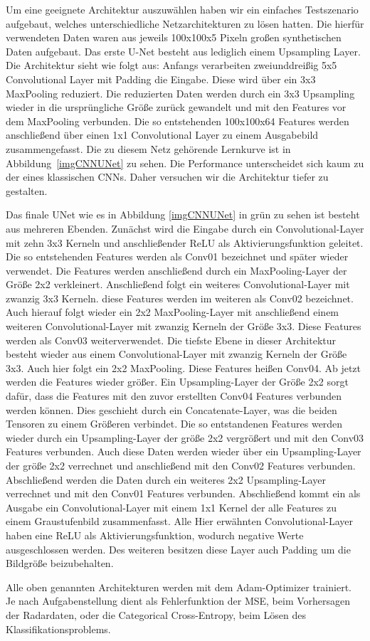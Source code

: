 Um eine geeignete Architektur auszuwählen haben wir ein einfaches Testszenario aufgebaut, welches unterschiedliche Netzarchitekturen zu lösen hatten. Die hierfür verwendeten Daten waren aus jeweils 100x100x5 Pixeln großen synthetischen Daten aufgebaut.
Das erste U-Net besteht aus lediglich einem Upsampling Layer. Die Architektur sieht wie folgt aus:
Anfangs verarbeiten zweiunddreißig 5x5 Convolutional Layer mit Padding die Eingabe. Diese wird über ein 3x3 MaxPooling reduziert. Die reduzierten Daten werden durch ein 3x3 Upsampling wieder in die ursprüngliche Größe zurück gewandelt und mit den Features vor dem MaxPooling verbunden. Die so entstehenden 100x100x64 Features werden anschließend über einen 1x1 Convolutional Layer zu einem Ausgabebild zusammengefasst.
Die zu diesem Netz gehörende Lernkurve ist in Abbildung~\ref{imgCNNUNet} zu sehen. Die Performance unterscheidet sich kaum zu der eines klassischen CNNs. Daher versuchen wir die Architektur tiefer zu gestalten.

Das finale UNet wie es in Abbildung \ref{imgCNNUNet} in grün zu sehen ist besteht aus mehreren Ebenden.
Zunächst wird die Eingabe durch ein Convolutional-Layer mit zehn 3x3 Kerneln und anschließender ReLU als Aktivierungsfunktion geleitet. Die so entstehenden Features werden als Conv01 bezeichnet und später wieder verwendet.
Die Features werden anschließend durch ein MaxPooling-Layer der Größe 2x2 verkleinert. Anschließend folgt ein weiteres Convolutional-Layer mit zwanzig 3x3 Kerneln. diese Features werden im weiteren als Conv02 bezeichnet.
Auch hierauf folgt wieder ein 2x2 MaxPooling-Layer mit anschließend einem weiteren Convolutional-Layer mit zwanzig Kerneln der Größe 3x3. Diese Features werden als Conv03 weiterverwendet.
Die tiefste Ebene in dieser Architektur besteht wieder aus einem Convolutional-Layer mit zwanzig Kerneln der Größe 3x3. Auch hier folgt ein 2x2 MaxPooling. Diese Features heißen Conv04.
Ab jetzt werden die Features wieder größer. Ein Upsampling-Layer der Größe 2x2 sorgt dafür, dass die Features mit den zuvor erstellten Conv04 Features verbunden werden können. Dies geschieht durch ein Concatenate-Layer, was die beiden Tensoren zu einem Größeren verbindet. Die so entstandenen Features werden wieder durch ein Upsampling-Layer der größe 2x2 vergrößert und mit den Conv03 Features verbunden. Auch diese Daten werden wieder über ein Upsampling-Layer der größe 2x2 verrechnet und anschließend mit den Conv02 Features verbunden. Abschließend werden die Daten durch ein weiteres 2x2 Upsampling-Layer verrechnet und mit den Conv01 Features verbunden. Abschließend kommt ein als Ausgabe ein Convolutional-Layer mit einem 1x1 Kernel der alle Features zu einem Graustufenbild zusammenfasst.
Alle Hier erwähnten Convolutional-Layer haben eine ReLU als Aktivierungsfunktion, wodurch negative Werte ausgeschlossen werden. Des weiteren besitzen diese Layer auch Padding um die Bildgröße beizubehalten.

Alle oben genannten Architekturen werden mit dem Adam-Optimizer trainiert. Je nach Aufgabenstellung dient als Fehlerfunktion der MSE, beim Vorhersagen der Radardaten, oder die Categorical Cross-Entropy, beim Lösen des Klassifikationsproblems.
